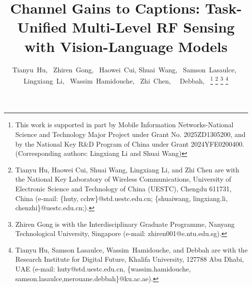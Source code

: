 \documentclass[journal,10pt,twocolumn]{IEEEtran}
\begin{document}
\title{\LARGE Channel Gains to Captions: Task-Unified Multi-Level RF Sensing with Vision-Language Models}
\author{Tianyu~Hu,~ Zhiren~Gong,~
        Haowei~Cui, Shuai~Wang,~ Samson~Lasaulce,~ Lingxiang~Li,~ Wassim~Hamidouche,~  
        Zhi~Chen,~ ~Debbah,~
    \thanks{This work is supported in part by Mobile Information Networks-National Science and Technology Major Project under Grant No. 2025ZD1305200, and by the National Key R\&D Program of China under Grant 2024YFE0200400. (Corresponding authors: Lingxiang Li and Shuai Wang)}
    \thanks{Tianyu Hu, Haowei Cui, Shuai Wang, Lingxiang Li, and Zhi Chen are with the National Key Laboratory of Wireless Communications, University of Electronic Science and Technology of China (UESTC), Chengdu 611731, China (e-mail: \{huty, cchw\}@std.uestc.edu.cn; \{shuaiwang, lingxiang.li, chenzhi\}@uestc.edu.cn;).}
    \thanks{Zhiren Gong is with the Interdisciplinary Graduate Programme, Nanyang Technological University, Singapore (e-mail: zhiren001@e.ntu.edu.sg).}
    \thanks{Tianyu Hu, Samson Lasaulce, Wassim~Hamidouche, and  Debbah are with the Research Institute for Digital Future, Khalifa University, 127788 Abu Dhabi, UAE (e-mail: huty@std.uestc.edu.cn, \{wassim.hamidouche, samson.lasaulce,merouane.debbah\}@ku.ac.ae).}
}
\IEEEaftertitletext{\vspace{-1.5\baselineskip}}
\maketitle
\end{document}
